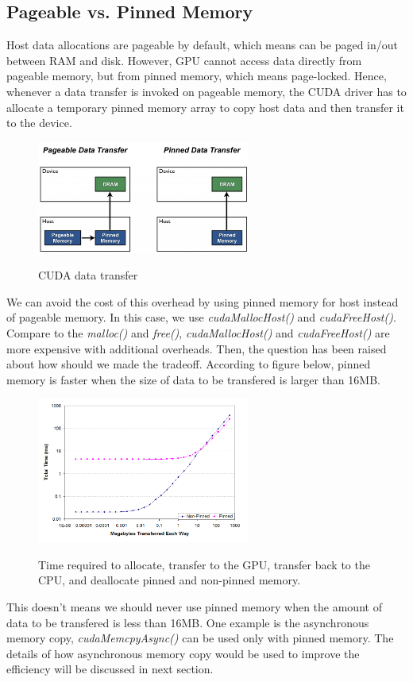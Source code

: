 \documentclass[letterpaper, 11 pt, conference]{ieeeconf}  %
\begin{document}
\subsection{Pageable vs. Pinned Memory}
Host data allocations are pageable by default, which means can be paged in/out between RAM and disk. However, GPU cannot access data directly from pageable memory, but from pinned memory, which means page-locked. Hence, whenever a data transfer is invoked on pageable memory, the CUDA driver has to allocate a temporary pinned memory array to copy host data and then transfer it to the device. \par
\begin{figure}[h]
	\centering\includegraphics[width=70mm]{pinned.jpg}
	\caption{CUDA data transfer}
	\label{CUDA data transfer.}
	\cite{Mark}
\end{figure}
We can avoid the cost of this overhead by using pinned memory for host instead of pageable memory. In this case, we use \textit{cudaMallocHost()} and \textit{cudaFreeHost()}. Compare to the \textit{malloc()} and \textit{free()}, \textit{cudaMallocHost()} and \textit{cudaFreeHost()} are more expensive with additional overheads. Then, the question has been raised about how should we made the tradeoff. According to figure below, pinned memory is faster when the size of data to be transfered is larger than 16MB. \par
\begin{figure}[h]
 	\centering\includegraphics[width=70mm]{pinned_trade_off.png}
 	\caption{Time required to allocate, transfer to the GPU, transfer back to the CPU, and deallocate pinned and non-pinned memory.}
 	\label{Time required to allocate, transfer to the GPU, transfer back to the CPU, and deallocate pinned and non-pinned memory.}
 	\cite{Trade_off}
\end{figure}
This doesn't means we should never use pinned memory when the amount of data to be transfered is less than 16MB. One example is the asynchronous memory copy, \textit{cudaMemcpyAsync()} can be used only with pinned memory. The details of how asynchronous memory copy would be used to improve the efficiency will be discussed in next section.
\end{document}
